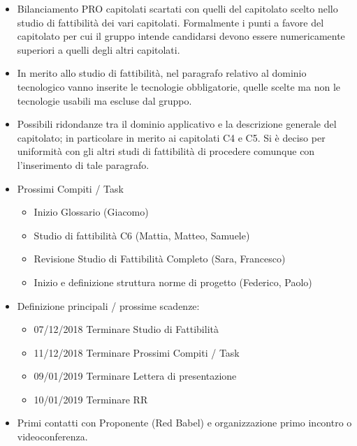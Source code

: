\documentclass[a4paper]{article}
\begin{document}
\begin{itemize}
\item Bilanciamento PRO capitolati scartati con quelli del capitolato scelto
nello studio di fattibilità dei vari capitolati. Formalmente i punti a favore 
del capitolato per cui il gruppo intende candidarsi devono essere numericamente
superiori a quelli degli altri capitolati.
\item In merito allo studio di fattibilità, nel paragrafo relativo al dominio
tecnologico vanno inserite le tecnologie obbligatorie, quelle scelte ma non le
tecnologie usabili ma escluse dal gruppo.
\item Possibili ridondanze tra il dominio applicativo e la descrizione generale
del capitolato; in particolare in merito ai capitolati C4 e C5. Si è deciso per
uniformità con gli altri studi di fattibilità di procedere comunque con
l’inserimento di tale paragrafo.
\item Prossimi Compiti / Task
\begin{itemize}
\item Inizio Glossario (Giacomo)
\item Studio di fattibilità C6 (Mattia, Matteo, Samuele)
\item Revisione Studio di Fattibilità Completo (Sara, Francesco)
\item Inizio e definizione struttura norme di progetto (Federico, Paolo)
\end{itemize}
\item Definizione principali / prossime scadenze:
\begin{itemize}
\item 07/12/2018 Terminare Studio di Fattibilità 
\item 11/12/2018 Terminare Prossimi Compiti / Task
\item 09/01/2019 Terminare Lettera di presentazione
\item 10/01/2019 Terminare RR
\end{itemize}
\item Primi contatti con Proponente (Red Babel) e organizzazione primo incontro
o videoconferenza.
\end{itemize}
\end{document}
